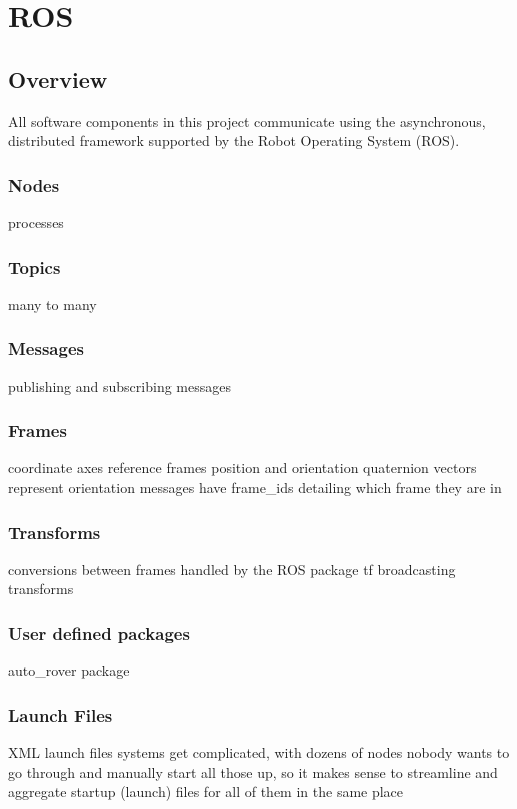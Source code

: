 \chapter{ROS}

\section{Overview}
All software components in this project communicate using the asynchronous, distributed framework supported by the Robot Operating System (ROS). 

\subsection{Nodes}
processes

\subsection{Topics}
many to many

\subsection{Messages}
publishing and subscribing messages

\subsection{Frames}
coordinate axes
reference frames
position and orientation
quaternion vectors represent orientation
messages have frame\_ids detailing which frame they are in

\subsection{Transforms}
conversions between frames
handled by the ROS package tf
broadcasting transforms


\subsection{User defined packages}
auto\_rover package

\subsection{Launch Files}
XML launch files
systems get complicated, with dozens of nodes
nobody wants to go through and manually start all those up, so it makes sense to streamline and aggregate startup (launch) files for all of them in the same place


